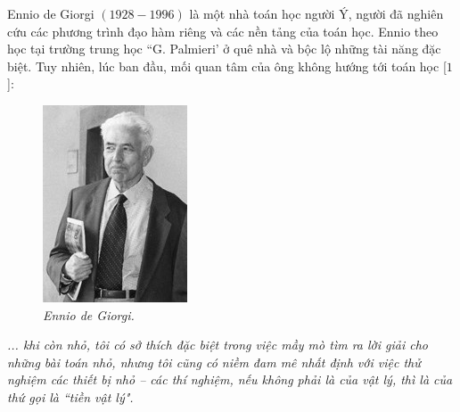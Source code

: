 \begin{multicols}{2}
	Ennio de Giorgi $(1928-1996)$ là một nhà toán học người Ý, người đã nghiên cứu các phương trình đạo hàm riêng và các nền tảng của toán học. Ennio theo học tại trường trung học ``G. Palmieri' ở quê nhà và bộc lộ những tài năng đặc biệt. Tuy nhiên, lúc ban đầu, mối quan tâm của ông không hướng tới toán học [$1$]:
	\vskip 0.01cm
	\begin{figure}
		\vspace*{-10pt}
		\centering
		\captionsetup{labelformat= empty, justification=centering}
		\includegraphics[width= 1\linewidth]{1}
		\caption{\small\textit{\color{quantoan}Ennio de Giorgi.}}
		\vspace*{-15pt}
	\end{figure}
	\textit{... khi còn nhỏ, tôi có sở thích đặc biệt trong việc mầy mò tìm ra lời giải cho những bài toán nhỏ, nhưng tôi cũng có niềm đam mê nhất định với việc thử nghiệm các thiết bị nhỏ -- các thí nghiệm, nếu không phải là của vật lý, thì là của thứ gọi là ``tiền vật lý".}

\end{multicols}
